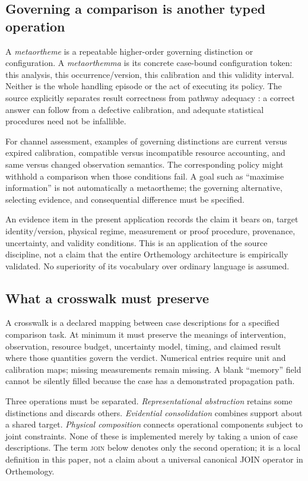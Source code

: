 \subsection{Governing a comparison is another typed operation}
A \emph{metaortheme} is a repeatable higher-order governing distinction or configuration. A \emph{metaorthemma} is its concrete case-bound configuration token: this analysis, this occurrence/version, this calibration and this validity interval. Neither is the whole handling episode or the act of executing its policy. The source explicitly separates result correctness from pathway adequacy \citep{orthemology}: a correct answer can follow from a defective calibration, and adequate statistical procedures need not be infallible.

For channel assessment, examples of governing distinctions are current versus expired calibration, compatible versus incompatible resource accounting, and same versus changed observation semantics. The corresponding policy might withhold a comparison when those conditions fail. A goal such as ``maximise information'' is not automatically a metaortheme; the governing alternative, selecting evidence, and consequential difference must be specified.

An evidence item in the present application records the claim it bears on, target identity/version, physical regime, measurement or proof procedure, provenance, uncertainty, and validity conditions. This is an application of the source discipline, not a claim that the entire Orthemology architecture is empirically validated. No superiority of its vocabulary over ordinary language is assumed.

\subsection{What a crosswalk must preserve}
A crosswalk is a declared mapping between case descriptions for a specified comparison task. At minimum it must preserve the meanings of intervention, observation, resource budget, uncertainty model, timing, and claimed result where those quantities govern the verdict. Numerical entries require unit and calibration maps; missing measurements remain missing. A blank ``memory'' field cannot be silently filled because the case has a demonstrated propagation path.

Three operations must be separated. \emph{Representational abstraction} retains some distinctions and discards others. \emph{Evidential consolidation} combines support about a shared target. \emph{Physical composition} connects operational components subject to joint constraints. None of these is implemented merely by taking a union of case descriptions. The term \textsc{join} below denotes only the second operation; it is a local definition in this paper, not a claim about a universal canonical JOIN operator in Orthemology.

